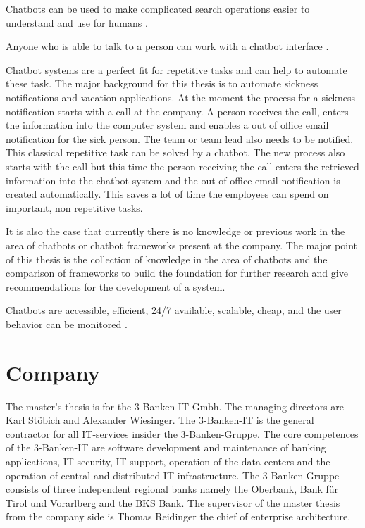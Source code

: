 \documentclass[12pt, backref]{report}
\begin{document}
Chatbots can be used to make complicated search operations easier to understand and use for humans \cite{kane2016role}.

Anyone who is able to talk to a person can work with a chatbot interface \cite{buiildChatbotsPython}.

Chatbot systems are a perfect fit for repetitive tasks and can help to automate these task. The major background for this thesis is to automate sickness notifications and vacation applications. At the moment the process for a sickness notification starts with a call at the company. A person receives the call, enters the information into the computer system and enables a out of office email notification for the sick person. The team or team lead also needs to be notified. This classical repetitive task can be solved by a chatbot. The new process also starts with the call but this time the person receiving the call enters the retrieved information into the chatbot system and the out of office email notification is created automatically. This saves a lot of time the employees can spend on important, non repetitive tasks.


It is also the case that currently there is no knowledge or previous work in the area of chatbots or chatbot frameworks present at the company. The major point of this thesis is the collection of knowledge in the area of chatbots and the comparison of frameworks to build the foundation for further research and give recommendations for the development of a system.


Chatbots are accessible, efficient, 24/7 available, scalable, cheap, and the user behavior can be monitored \cite{buiildChatbotsPython}.

\section{Company}
The master's thesis is for the 3-Banken-IT Gmbh. The managing directors are Karl St\"obich and Alexander Wiesinger. \cite{3bitorgani}
The 3-Banken-IT is the general contractor for all IT-services insider the 3-Banken-Gruppe. \cite{3bitservices}
The core competences of the 3-Banken-IT are software development and maintenance of banking applications, IT-security, IT-support, operation of the data-centers and the operation of central and distributed IT-infrastructure. \cite{3bitservices}
The 3-Banken-Gruppe consists of three independent regional banks namely the Oberbank, Bank für Tirol und Vorarlberg and the BKS Bank. \cite{3bitcompany}
The supervisor of the master thesis from the company side is Thomas Reidinger the chief of enterprise architecture.
\end{document}
